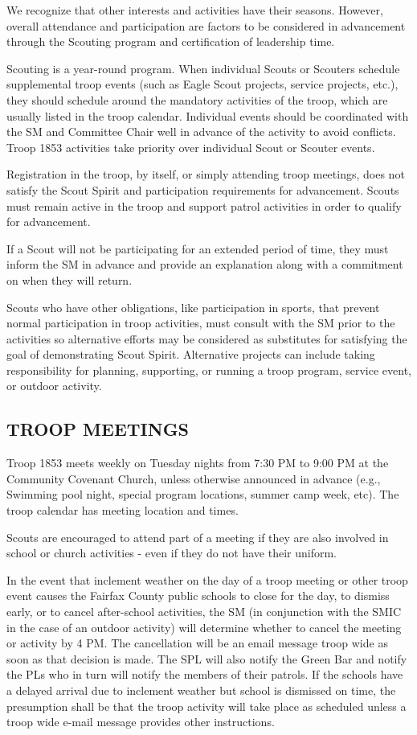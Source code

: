 \documentclass{ltxguide}
\begin{document}
We recognize that other interests and activities have their seasons. However, overall attendance and participation are factors to be considered in advancement through the Scouting program and certification of leadership time.

Scouting is a year-round program. When individual Scouts or Scouters schedule supplemental troop events (such as Eagle Scout projects, service projects, etc.), they should schedule around the mandatory activities of the troop, which are usually listed in the troop calendar. Individual events should be coordinated with the \ac{SM} and Committee Chair well in advance of the activity to avoid conflicts. Troop 1853 activities take priority over individual Scout or Scouter events.

Registration in the troop, by itself, or simply attending troop meetings, does not satisfy the Scout Spirit and participation requirements for advancement. Scouts must remain active in the troop and support patrol activities in order to qualify for advancement.

If a Scout will not be participating for an extended period of time, they must inform the \ac{SM} in advance and provide an explanation along with a commitment on when they will return.

Scouts who have other obligations, like participation in sports, that prevent normal participation in troop activities, must consult with the \ac{SM} prior to the activities so alternative efforts may be considered as substitutes for satisfying the goal of demonstrating Scout Spirit. Alternative projects can include taking responsibility for planning, supporting, or running a troop program, service event, or outdoor activity.

\subsection{TROOP MEETINGS}
Troop 1853 meets weekly on Tuesday nights from 7:30 PM to 9:00 PM at the Community Covenant Church, unless otherwise announced in advance (e.g., Swimming pool night, special program locations, summer camp week, etc). The troop calendar has meeting location and times.

Scouts are encouraged to attend part of a meeting if they are also involved in school or church activities - even if they do not have their uniform.

In the event that inclement weather on the day of a troop meeting or other troop event causes the Fairfax County public schools to close for the day, to dismiss early, or to cancel after-school activities, the \ac{SM} (in conjunction with the SMIC in the case of an outdoor activity) will determine whether to cancel the meeting or activity by 4 PM. The cancellation will be an email message troop wide as soon as that decision is made. The \ac{SPL} will also notify the Green Bar and notify the \acp{PL} who in turn will notify the members of their patrols. If the schools have a delayed arrival due to inclement weather but school is dismissed on time, the presumption shall be that the troop activity will take place as scheduled unless a troop wide e-mail message provides other instructions.
\end{document}
